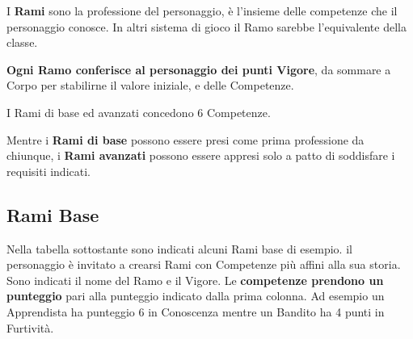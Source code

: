 \documentclass[12pt,a4paper,twoside,openany]{book}
\begin{document}
\begin{multicols}{2}

I \textbf{Rami} sono la professione del personaggio, è l'insieme delle competenze che il personaggio conosce. In altri sistema di gioco il Ramo sarebbe l'equivalente della classe.

\textbf{Ogni Ramo conferisce al personaggio dei punti Vigore}, da sommare a Corpo per stabilirne il valore iniziale, e delle Competenze.

I Rami di base ed avanzati concedono 6 Competenze.

Mentre i \textbf{Rami di base} possono essere presi come prima professione da chiunque, i\textbf{ Rami avanzati} possono essere appresi solo a patto di soddisfare i requisiti indicati.

\subsection{Rami Base}

Nella tabella sottostante sono indicati alcuni Rami base di esempio. il personaggio è invitato a crearsi Rami con Competenze più affini alla sua storia.
Sono indicati il nome del Ramo e il Vigore. Le \textbf{competenze prendono un punteggio} pari alla punteggio indicato dalla prima colonna. Ad esempio un Apprendista ha punteggio 6 in Conoscenza mentre un Bandito ha 4 punti in Furtività.

\end{multicols}
\end{document}
